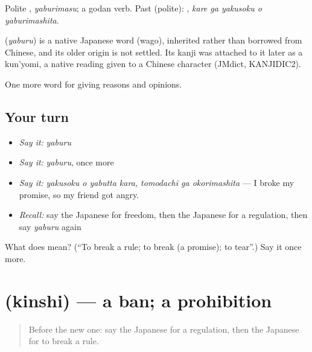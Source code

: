 Polite \textbf{}, \emph{yaburimasu}; a godan verb. Past (polite): \textbf{  }, \emph{kare ga yakusoku o yaburimashita}.

\begin{cousinweb}
\textbf{} (\emph{yaburu}) is a native Japanese word (wago), inherited rather than borrowed from Chinese, and its older origin is not settled. Its kanji was attached to it later as a kun'yomi, a native reading given to a Chinese character (JMdict, KANJIDIC2).
\end{cousinweb}

\begin{grammarlens}[title={What you've built}]
One more word for giving reasons and opinions.
\end{grammarlens}

\subsection*{Your turn}
\begin{itemize}
\raggedright
  \item \emph{Say it:} \emph{yaburu}
  \item \emph{Say it:} \emph{yaburu}, once more
  \item \emph{Say it:} \emph{yakusoku o yabutta kara, tomodachi ga okorimashita} — I broke my promise, so my friend got angry.
  \item \emph{Recall:} say the Japanese for freedom, then the Japanese for a regulation, then say \emph{yaburu} again
\end{itemize}

\begin{tcolorbox}[breakable,colback=teal!4,colframe=teal!35!black,title={Before you move on}]
What does  mean? (\textquotedblleft{}To break a rule; to break (a promise); to tear\textquotedblright{}.) Say it once more.
\end{tcolorbox}
\section[\texorpdfstring{\ja{きんし} (kinshi)}{きんし (kinshi)}]{ (kinshi) — a ban; a prohibition}

\label{lesson:JA-C326-kinshi}



\begin{quote}
Before the new one: say the Japanese for a regulation, then the Japanese for to break a rule.
\end{quote}


